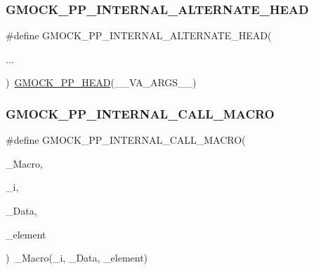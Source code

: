 \mbox{\label{googletest-master_2googlemock_2include_2gmock_2internal_2gmock-pp_8h_a397716c397c91563dfbb9c3b974dc2dc}} 
\subsubsection{\texorpdfstring{GMOCK\_PP\_INTERNAL\_ALTERNATE\_HEAD}{GMOCK\_PP\_INTERNAL\_ALTERNATE\_HEAD}}
{\footnotesize\ttfamily \#define G\+M\+O\+C\+K\+\_\+\+P\+P\+\_\+\+I\+N\+T\+E\+R\+N\+A\+L\+\_\+\+A\+L\+T\+E\+R\+N\+A\+T\+E\+\_\+\+H\+E\+AD(\begin{DoxyParamCaption}\item[{}]{... }\end{DoxyParamCaption})~\mbox{\hyperlink{_obj__test_2lib_2googletest-master_2googlemock_2include_2gmock_2internal_2gmock-pp_8h_ad7910160dfc0fb20b239efcf1f3ddd85}{G\+M\+O\+C\+K\+\_\+\+P\+P\+\_\+\+H\+E\+AD}}(\+\_\+\+\_\+\+V\+A\+\_\+\+A\+R\+G\+S\+\_\+\+\_\+)}

\mbox{\label{googletest-master_2googlemock_2include_2gmock_2internal_2gmock-pp_8h_a3fe0cf255d103cc945cd91e0e953846f}} 
\subsubsection{\texorpdfstring{GMOCK\_PP\_INTERNAL\_CALL\_MACRO}{GMOCK\_PP\_INTERNAL\_CALL\_MACRO}}
{\footnotesize\ttfamily \#define G\+M\+O\+C\+K\+\_\+\+P\+P\+\_\+\+I\+N\+T\+E\+R\+N\+A\+L\+\_\+\+C\+A\+L\+L\+\_\+\+M\+A\+C\+RO(\begin{DoxyParamCaption}\item[{}]{\+\_\+\+Macro,  }\item[{}]{\+\_\+i,  }\item[{}]{\+\_\+\+Data,  }\item[{}]{\+\_\+element }\end{DoxyParamCaption})~\+\_\+\+Macro(\+\_\+i, \+\_\+\+Data, \+\_\+element)}

